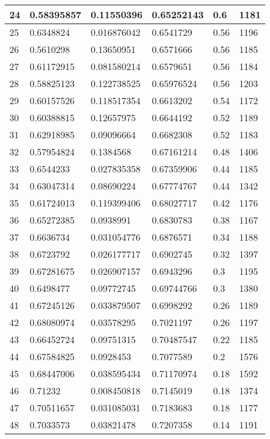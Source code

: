 \begin{longtable}{|l|l|l|l|l|l|}
24 & 0.58395857 & 0.11550396 & 0.65252143 & 0.6 & 1181 \\ \hline 
25 & 0.6348824 & 0.016876042 & 0.6541729 & 0.56 & 1196 \\ \hline 
26 & 0.5610298 & 0.13650951 & 0.6571666 & 0.56 & 1185 \\ \hline 
27 & 0.61172915 & 0.081580214 & 0.6579651 & 0.56 & 1184 \\ \hline 
28 & 0.58825123 & 0.122738525 & 0.65976524 & 0.56 & 1203 \\ \hline 
29 & 0.60157526 & 0.118517354 & 0.6613202 & 0.54 & 1172 \\ \hline 
30 & 0.60388815 & 0.12657975 & 0.6644192 & 0.52 & 1189 \\ \hline 
31 & 0.62918985 & 0.09096664 & 0.6682308 & 0.52 & 1183 \\ \hline 
32 & 0.57954824 & 0.1384568 & 0.67161214 & 0.48 & 1406 \\ \hline 
33 & 0.6544233 & 0.027835358 & 0.67359906 & 0.44 & 1185 \\ \hline 
34 & 0.63047314 & 0.08690224 & 0.67774767 & 0.44 & 1342 \\ \hline 
35 & 0.61724013 & 0.119399406 & 0.68027717 & 0.42 & 1176 \\ \hline 
36 & 0.65272385 & 0.0938991 & 0.6830783 & 0.38 & 1167 \\ \hline 
37 & 0.6636734 & 0.031054776 & 0.6876571 & 0.34 & 1188 \\ \hline 
38 & 0.6723792 & 0.026177717 & 0.6902745 & 0.32 & 1397 \\ \hline 
39 & 0.67281675 & 0.026907157 & 0.6943296 & 0.3 & 1195 \\ \hline 
40 & 0.6498477 & 0.09772745 & 0.69744766 & 0.3 & 1380 \\ \hline 
41 & 0.67245126 & 0.033879507 & 0.6998292 & 0.26 & 1189 \\ \hline 
42 & 0.68080974 & 0.03578295 & 0.7021197 & 0.26 & 1197 \\ \hline 
43 & 0.66452724 & 0.09751315 & 0.70487547 & 0.22 & 1185 \\ \hline 
44 & 0.67584825 & 0.0928453 & 0.7077589 & 0.2 & 1576 \\ \hline 
45 & 0.68447006 & 0.038595434 & 0.71170974 & 0.18 & 1592 \\ \hline 
46 & 0.71232 & 0.008450818 & 0.7145019 & 0.18 & 1374 \\ \hline 
47 & 0.70511657 & 0.031085031 & 0.7183683 & 0.18 & 1177 \\ \hline 
48 & 0.7033573 & 0.03821478 & 0.7207358 & 0.14 & 1191 \\ \hline 

\end{longtable}
